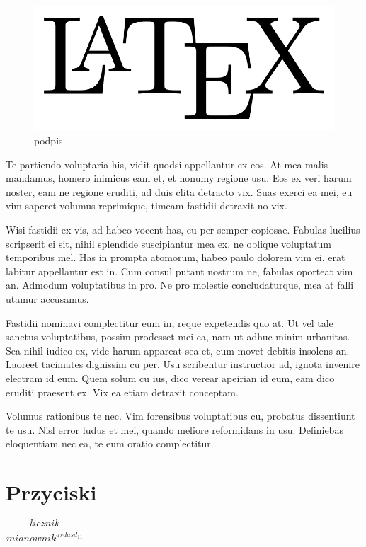 \documentclass{article}
\begin{document}
\begin{figure}
	\centering
	\includegraphics[width=0.7\linewidth]{latex}
	\caption{podpis}
	\label{fig:latex}
\end{figure}
	
	Te partiendo voluptaria his, vidit quodsi appellantur ex eos. At mea malis mandamus, homero inimicus eam et, et nonumy regione usu. Eos ex veri harum noster, eam ne regione eruditi, ad duis clita detracto vix. Suas exerci ea mei, eu vim saperet volumus reprimique, timeam fastidii detraxit no vix.
	
	Wisi fastidii ex vis, ad habeo vocent has, eu per semper copiosae. Fabulas lucilius scripserit ei sit, nihil splendide suscipiantur mea ex, ne oblique voluptatum temporibus mel. Has in prompta atomorum, habeo paulo dolorem vim ei, erat labitur appellantur est in. Cum consul putant nostrum ne, fabulas oporteat vim an. Admodum voluptatibus in pro. Ne pro molestie concludaturque, mea at falli utamur accusamus.
	
	Fastidii nominavi complectitur eum in, reque expetendis quo at. Ut vel tale sanctus voluptatibus, possim prodesset mei ea, nam ut adhuc minim urbanitas. Sea nihil iudico ex, vide harum appareat sea et, eum movet debitis insolens an. Laoreet tacimates dignissim cu per. Usu scribentur instructior ad, ignota invenire electram id eum. Quem solum cu ius, dico verear apeirian id eum, eam dico eruditi praesent ex. Vix ea etiam detraxit conceptam.
	
	Volumus rationibus te nec. Vim forensibus voluptatibus cu, probatus dissentiunt te usu. Nisl error ludus et mei, quando meliore reformidans in usu. Definiebas eloquentiam nec ea, te eum oratio complectitur.
\section{Przyciski}

	$\dfrac{licznik}{mianownik^{asdasd_11}}$
	\label{LastPage}
\end{document}
